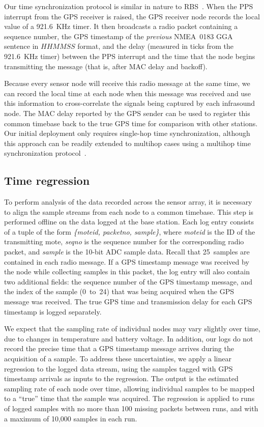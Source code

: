 Our time synchronization protocol is similar in nature to
RBS~\cite{elson-rbs}. When the PPS interrupt from the GPS receiver 
is raised, the GPS receiver node records the local value of a 921.6~KHz 
timer. It then broadcasts a radio packet containing a sequence number,
the GPS timestamp of the {\em previous\/} NMEA~0183 GGA sentence in
$HHMMSS$ format, and the delay (measured in ticks from the 921.6~KHz
timer) between the PPS interrupt and the time that the node begins
transmitting the message (that is, after MAC delay and backoff).

Because every sensor node will receive this radio message at the same
time, we can record the local time at each node when this message was
received and use this information to cross-correlate the
signals being captured by each infrasound node.
The MAC delay reported by the GPS sender can be used to register this 
common timebase back to the true GPS time for comparison with other
stations. Our initial deployment only requires single-hop time 
synchronization, although this approach can be readily extended to multihop
cases using a multihop time synchronization 
protocol~\cite{vanderbilt-flooding}.

\subsection{Time regression}
\label{sec-regression}

To perform analysis of the data recorded across the sensor array, it
is necessary to align the sample streams from each node to a common
timebase. This step is performed offline on the data logged at
the base station. Each log entry consists of a tuple of the form
{\em \{moteid, packetno, sample\}}, where {\em moteid} is the ID of the 
transmitting mote, {\em seqno} is the sequence number for the 
corresponding radio packet, and {\em sample} is
the 10-bit ADC sample data. Recall that 25~samples are contained in each
radio message. If a GPS timestamp message was received by
the node while collecting samples in this packet, the log entry 
will also contain two additional fields: the sequence number of the
GPS timestamp message, and the index of the sample (0~to~24) that 
was being acquired when the GPS message was received.
The true GPS time and transmission delay for each GPS timestamp is
logged separately.

We expect that the sampling rate of individual
nodes may vary slightly over time, due to changes in temperature 
and battery voltage. In addition, our logs do not record the precise
time that a GPS timestamp message arrives during the acquisition of
a sample. To address these uncertainties, we apply a linear regression 
to the logged data stream, using the samples tagged with GPS timestamp
arrivals as inputs to the regression. The output is the estimated 
sampling rate of each node over time, allowing individual samples to
be mapped to a ``true'' time that the sample was acquired.
The regression is applied to runs of logged samples with no more than
100 missing packets between runs, and with a maximum of 10,000 samples
in each run. 

